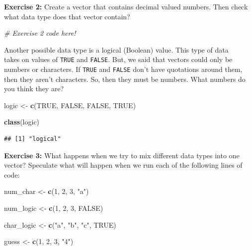 \documentclass[]{article}
\newenvironment{Shaded}{\begin{snugshade}}{\end{snugshade}}
\newcommand{\KeywordTok}[1]{\textcolor[rgb]{0.13,0.29,0.53}{\textbf{#1}}}
\newcommand{\DecValTok}[1]{\textcolor[rgb]{0.00,0.00,0.81}{#1}}
\newcommand{\StringTok}[1]{\textcolor[rgb]{0.31,0.60,0.02}{#1}}
\newcommand{\CommentTok}[1]{\textcolor[rgb]{0.56,0.35,0.01}{\textit{#1}}}
\newcommand{\OtherTok}[1]{\textcolor[rgb]{0.56,0.35,0.01}{#1}}
\newcommand{\NormalTok}[1]{#1}
\begin{document}
\textbf{Exercise 2:} Create a vector that contains decimal valued
numbers. Then check what data type does that vector contain?

\begin{Shaded}
\begin{Highlighting}[]
\CommentTok{# Exercise 2 code here!}
\end{Highlighting}
\end{Shaded}

\newpage

Another possible data type is a logical (Boolean) value. This type of
data\\
takes on values of \texttt{TRUE} and \texttt{FALSE}. But, we said that
vectors could only be numbers or characters. If \texttt{TRUE} and
\texttt{FALSE} don't have quotations around them, then they aren't
characters. So, then they must be numbers. What numbers do you think
they are?

\vspace{0.25cm}

\begin{Shaded}
\begin{Highlighting}[]
\NormalTok{logic <-}\StringTok{ }\KeywordTok{c}\NormalTok{(}\OtherTok{TRUE}\NormalTok{, }\OtherTok{FALSE}\NormalTok{, }\OtherTok{FALSE}\NormalTok{, }\OtherTok{TRUE}\NormalTok{)}

\KeywordTok{class}\NormalTok{(logic)}
\end{Highlighting}
\end{Shaded}

\begin{verbatim}
## [1] "logical"
\end{verbatim}

\vspace{0.25cm}

\textbf{Exercise 3:} What happens when we try to mix different data
types into one vector? Speculate what will happen when we run each of
the following lines of code:

\vspace{0.25cm}

\begin{Shaded}
\begin{Highlighting}[]
\NormalTok{num_char <-}\StringTok{ }\KeywordTok{c}\NormalTok{(}\DecValTok{1}\NormalTok{, }\DecValTok{2}\NormalTok{, }\DecValTok{3}\NormalTok{, }\StringTok{"a"}\NormalTok{)}

\NormalTok{num_logic <-}\StringTok{ }\KeywordTok{c}\NormalTok{(}\DecValTok{1}\NormalTok{, }\DecValTok{2}\NormalTok{, }\DecValTok{3}\NormalTok{, }\OtherTok{FALSE}\NormalTok{)}

\NormalTok{char_logic <-}\StringTok{ }\KeywordTok{c}\NormalTok{(}\StringTok{"a"}\NormalTok{, }\StringTok{"b"}\NormalTok{, }\StringTok{"c"}\NormalTok{, }\OtherTok{TRUE}\NormalTok{)}

\NormalTok{guess <-}\StringTok{ }\KeywordTok{c}\NormalTok{(}\DecValTok{1}\NormalTok{, }\DecValTok{2}\NormalTok{, }\DecValTok{3}\NormalTok{, }\StringTok{"4"}\NormalTok{)}
\end{Highlighting}
\end{Shaded}
\end{document}
